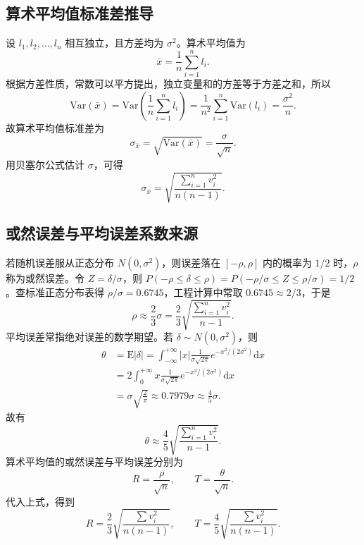 \documentclass[UTF8,12pt,a4paper]{ctexart}
\newcommand{\dd}{\mathrm{d}}
\newcommand{\E}{\mathrm{E}}
\newcommand{\Var}{\mathrm{Var}}
\newcommand{\abs}[1]{\left|#1\right|}
\begin{document}
\subsection{算术平均值标准差推导}
设 $l_1,l_2,\ldots,l_n$ 相互独立，且方差均为 $\sigma^2$。算术平均值为
\begin{equation*}
    \bar{x}=\frac{1}{n}\sum_{i=1}^{n}l_i .
\end{equation*}
根据方差性质，常数可以平方提出，独立变量和的方差等于方差之和，所以
\begin{equation*}
    \Var(\bar{x})=\Var\left(\frac{1}{n}\sum_{i=1}^{n}l_i\right)=\frac{1}{n^2}\sum_{i=1}^{n}\Var(l_i)=\frac{\sigma^2}{n}.
\end{equation*}
故算术平均值标准差为
\begin{equation*}
    \sigma_{\bar{x}}=\sqrt{\Var(\bar{x})}=\frac{\sigma}{\sqrt{n}} .
\end{equation*}
用贝塞尔公式估计 $\sigma$，可得
\begin{equation*}
    \sigma_{\bar{x}}=\sqrt{\frac{\sum_{i=1}^{n}v_i^2}{n(n-1)}} .
\end{equation*}

\subsection{或然误差与平均误差系数来源}
若随机误差服从正态分布 $N(0,\sigma^2)$，则误差落在 $[-\rho,\rho]$ 内的概率为 $1/2$ 时，$\rho$ 称为或然误差。令 $Z=\delta/\sigma$，则 $P(-\rho\le \delta\le \rho)=P(-\rho/\sigma\le Z\le \rho/\sigma)=1/2$。查标准正态分布表得 $\rho/\sigma=0.6745$，工程计算中常取 $0.6745\approx 2/3$，于是
\begin{equation*}
    \rho\approx \frac{2}{3}\sigma
    =\frac{2}{3}\sqrt{\frac{\sum_{i=1}^{n}v_i^2}{n-1}} .
\end{equation*}
平均误差常指绝对误差的数学期望。若 $\delta\sim N(0,\sigma^2)$，则
\begin{equation*}
\begin{aligned}
    \theta
    &=\E\abs{\delta}
      =\int_{-\infty}^{+\infty}\abs{x}\frac{1}{\sigma\sqrt{2\pi}}
        e^{-x^2/(2\sigma^2)}\dd x       \\
    &=2\int_{0}^{+\infty}x\frac{1}{\sigma\sqrt{2\pi}}
        e^{-x^2/(2\sigma^2)}\dd x       \\
    &=\sigma\sqrt{\frac{2}{\pi}}
      \approx 0.7979\sigma
      \approx \frac{4}{5}\sigma .
\end{aligned}
\end{equation*}
故有
\begin{equation*}
    \theta\approx \frac{4}{5}\sqrt{\frac{\sum_{i=1}^{n}v_i^2}{n-1}} .
\end{equation*}
算术平均值的或然误差与平均误差分别为
\begin{equation*}
    R=\frac{\rho}{\sqrt{n}},
    \qquad
    T=\frac{\theta}{\sqrt{n}} .
\end{equation*}
代入上式，得到
\begin{equation*}
    R=\frac{2}{3}\sqrt{\frac{\sum v_i^2}{n(n-1)}},
    \qquad
    T=\frac{4}{5}\sqrt{\frac{\sum v_i^2}{n(n-1)}} .
\end{equation*}
\end{document}
